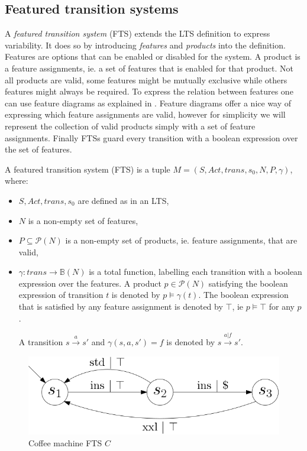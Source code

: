 \subsection{Featured transition systems}
A \textit{featured transition system} (FTS) extends the LTS definition to express variability. It does so by introducing \textit{features} and \textit{products} into the definition. Features are options that can be enabled or disabled for the system. A product is a feature assignments, ie. a set of features that is enabled for that product. Not all products are valid, some features might be mutually exclusive while others features might always be required. To express the relation between features one can use feature diagrams as explained in \cite{Classen2013FeaturedTS}. Feature diagrams offer a nice way of expressing which feature assignments are valid, however for simplicity we will represent the collection of valid products simply with a set of feature assignments. Finally FTSs guard every transition with a boolean expression over the set of features.
\begin{definition}
	\label{def_fts}\cite{Classen2013FeaturedTS} A featured transition system (FTS) is a tuple $M = (S, Act, trans, s_0, N, P, \gamma)$, where:
	\begin{itemize}
		\item $S, Act, trans, s_0$ are defined as in an LTS,
		\item $N$ is a non-empty set of features,
		\item $P \subseteq \mathcal{P}(N)$ is a non-empty set of products, ie. feature assignments, that are valid,
		\item $\gamma : trans \rightarrow \mathbb{B}(N)$ is a total function, labelling each transition with a boolean expression over the features. A product $p \in \mathcal{P}(N)$ satisfying the boolean expression of transition $t$ is denoted by $p \models \gamma(t)$. The boolean expression that is satisfied by any feature assignment is denoted by $\top$, ie $p \models \top$ for any $p$.
		
		A transition $s \xrightarrow a s'$ and $\gamma(s,a,s') = f$ is denoted by $s \xrightarrow {a | f} s'$. 
	\end{itemize}
\end{definition}
\begin{figure}[h]
\centering
\includegraphics[scale=0.3]{Examples/CoffeeMachine/FTS}
\caption[Coffee machine LTS]{Coffee machine FTS $C$}
\label{fig:coffeemachinefts}
\end{figure}

